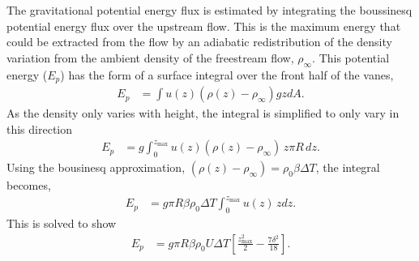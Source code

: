 The gravitational potential energy flux is estimated by integrating the
boussinesq potential energy flux over the upstream flow. 
This is the maximum energy that could be extracted from the flow by an 
adiabatic redistribution of the density variation from the ambient 
density of the freestream flow, $\rho_\infty$. 
This potential energy ($E_p$) has the form of a surface integral over 
the front half of the vanes, 
\begin{align*}
  E_p & = \int u(z) (\rho(z)-\rho_\infty) g z dA. 
\end{align*}
As the density only varies with height, the integral is simplified to only vary in 
this direction
\begin{align*}
  E_p  & = g \int^{z_\text{max}}_0 u(z) (\rho(z)-\rho_\infty) \, z  \pi
 R \, dz.
\end{align*}
Using the bousinesq approximation, $(\rho(z)-\rho_\infty)  = \rho_0 \beta \Delta T$,
the integral becomes, 
\begin{align*}
  E_p & = g  \pi R \beta \rho_0 \Delta T \int^{z_\text{max}}_0 u(z) \, z dz.
\end{align*}
This is solved to show
\begin{align*}
  E_p & = g  \pi R \beta \rho_0 U \Delta T \left[ \frac{z_\text{max}^2}{2} - \frac{7 \delta^2}{18} \right].
\end{align*}

%
% 
%
%
%


